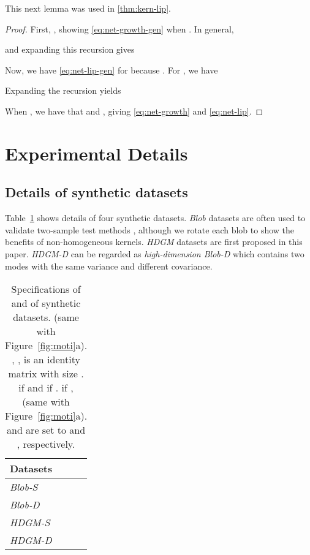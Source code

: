 \documentclass{article}
\begin{document}
This next lemma was used in \cref{thm:kern-lip}.

\dnnlip*
\begin{proof}
    First, ,
    showing \eqref{eq:net-growth-gen} when .
    In general,
    
    and expanding this recursion gives
    


    Now, we have \eqref{eq:net-lip-gen} for 
    because .
    For , we have
    
    Expanding the recursion yields
    

    When , we have that  and ,
    giving \eqref{eq:net-growth} and \eqref{eq:net-lip}.
\end{proof}







\section{Experimental Details}\label{Asec:exp_set}

\subsection{Details of synthetic datasets}\label{Asec:syn_intro}

Table~\ref{tab:synthetic datasets} shows details of four synthetic datasets. \emph{Blob} datasets are often used to validate two-sample test methods \citep{Gretton2012NeurIPS,Jitkrittum2016,sutherland:mmd-opt}, although we rotate each blob to show the benefits of non-homogeneous kernels. \emph{HDGM} datasets are first proposed in this paper. \emph{HDGM-D} can be regarded as \emph{high-dimension Blob-D} which contains two modes with the same variance and different covariance.

\begin{table}[ht]
  \centering
\caption{Specifications of  and  of synthetic datasets.  (same with Figure~\ref{fig:moti}a). , ,  is an identity matrix with size .  if  and  if . if ,  (same with Figure~\ref{fig:moti}a).  and  are set to  and , respectively.}\label{tab:synthetic datasets}

    \begin{tabular}{lll}
    \toprule
    \rule{0em}{1em}Datasets &   &  \rule{0em}{1em} \\
    \midrule
    \rule{0em}{1.5em}\emph{Blob-S} &  &  \\
    \rule{0em}{2em}\emph{Blob-D} &  &  \\
    \rule{0em}{1.5em}\emph{HDGM-S} &  &  \\
    \rule{0em}{2.2em}\emph{HDGM-D} &  &  \\
    \bottomrule
    \end{tabular}\vspace{-0.5em}
\end{table}
\end{document}
